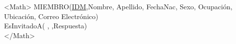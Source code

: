 \documentclass{article}
\begin{document}
\newpage


<Math>
MIEMBRO(\underline{IDM},Nombre, Apellido, FechaNac, Sexo, Ocupaci\'on, Ubicaci\'on, Correo Electr\'onico)\\
EsInvitadoA( { } \quad,  { } \quad,Respuesta)\\ 
</Math>
\end{document}
